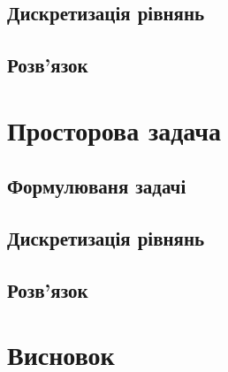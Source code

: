 \subsection{Дискретизація рівнянь}

\subsection{Розв'язок}

\section{Просторова задача}

\subsection{Формулюваня задачі}

\subsection{Дискретизація рівнянь}

\subsection{Розв'язок}

\section{Висновок}
